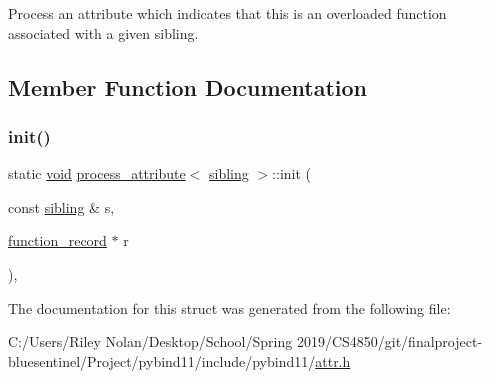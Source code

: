 Process an attribute which indicates that this is an overloaded function associated with a given sibling. 

\subsection{Member Function Documentation}
\mbox{\label{structprocess__attribute_3_01sibling_01_4_a32eab1996a15ef84e77587b8f29d21f3}} 
\subsubsection{\texorpdfstring{init()}{init()}}
{\footnotesize\ttfamily static \mbox{\hyperlink{_s_d_l__opengles2__gl2ext_8h_ae5d8fa23ad07c48bb609509eae494c95}{void}} \mbox{\hyperlink{structprocess__attribute}{process\+\_\+attribute}}$<$ \mbox{\hyperlink{structsibling}{sibling}} $>$\+::init (\begin{DoxyParamCaption}\item[{const \mbox{\hyperlink{structsibling}{sibling}} \&}]{s,  }\item[{\mbox{\hyperlink{structfunction__record}{function\+\_\+record}} $\ast$}]{r }\end{DoxyParamCaption})\hspace{0.3cm}{\ttfamily [inline]}, {\ttfamily [static]}}



The documentation for this struct was generated from the following file\+:\begin{DoxyCompactItemize}
\item 
C\+:/\+Users/\+Riley Nolan/\+Desktop/\+School/\+Spring 2019/\+C\+S4850/git/finalproject-\/bluesentinel/\+Project/pybind11/include/pybind11/\mbox{\hyperlink{attr_8h}{attr.\+h}}\end{DoxyCompactItemize}
